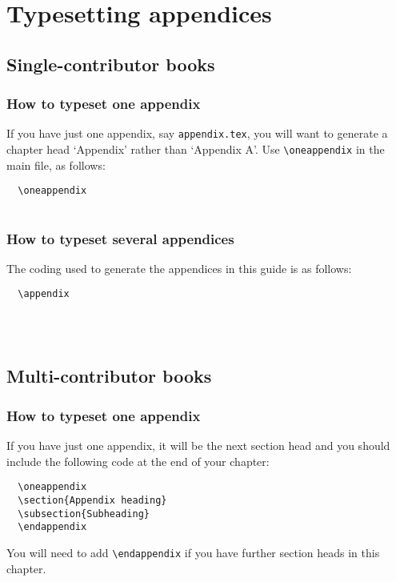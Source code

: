 
\chapter{Typesetting appendices}

\section{Single-contributor books}
\subsection{How to typeset one appendix}
If you have just one appendix, say \verb"appendix.tex", you will want to generate a chapter head `Appendix' rather than `Appendix A'. Use \verb"\oneappendix" in the main file, as follows:
\begin{verbatim}
  \oneappendix
  
\end{verbatim}

\subsection{How to typeset several appendices}
The coding used to generate the appendices in this guide is as follows:
\begin{verbatim}
  \appendix
  
  
  
\end{verbatim}

\section{Multi-contributor books}

\subsection{How to typeset one appendix}
If you have just one appendix, it will be the next section head and you should include the following code at the end of your chapter:
\begin{verbatim}
  \oneappendix
  \section{Appendix heading}
  \subsection{Subheading}
  \endappendix
\end{verbatim}
You will need to add \verb"\endappendix" if you have further section heads in this chapter.



